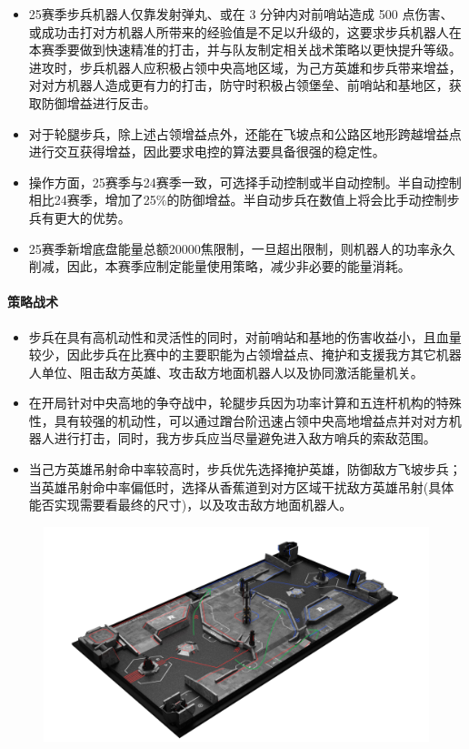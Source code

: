\begin{itemize}
            \item 25赛季步兵机器人仅靠发射弹丸、或在 3 分钟内对前哨站造成 500 点伤害、或成功击打对方机器人所带来的经验值是不足以升级的，这要求步兵机器人在本赛季要做到快速精准的打击，并与队友制定相关战术策略以更快提升等级。进攻时，步兵机器人应积极占领中央高地区域，为己方英雄和步兵带来增益，对对方机器人造成更有力的打击，防守时积极占领堡垒、前哨站和基地区，获取防御增益进行反击。
            \item 对于轮腿步兵，除上述占领增益点外，还能在飞坡点和公路区地形跨越增益点进行交互获得增益，因此要求电控的算法要具备很强的稳定性。
            \item 操作方面，25赛季与24赛季一致，可选择手动控制或半自动控制。半自动控制相比24赛季，增加了25\%的防御增益。半自动步兵在数值上将会比手动控制步兵有更大的优势。	
            \item 25赛季新增底盘能量总额20000焦限制，一旦超出限制，则机器人的功率永久削减，因此，本赛季应制定能量使用策略，减少非必要的能量消耗。
        \end{itemize}
    
    \paragraph{策略战术}


        \begin{itemize}
            \item 步兵在具有高机动性和灵活性的同时，对前哨站和基地的伤害收益小，且血量较少，因此步兵在比赛中的主要职能为占领增益点、掩护和支援我方其它机器人单位、阻击敌方英雄、攻击敌方地面机器人以及协同激活能量机关。
            \item 在开局针对中央高地的争夺战中，轮腿步兵因为功率计算和五连杆机构的特殊性，具有较强的机动性，可以通过蹭台阶迅速占领中央高地增益点并对对方机器人进行打击，同时，我方步兵应当尽量避免进入敌方哨兵的索敌范围。
            \item 当己方英雄吊射命中率较高时，步兵优先选择掩护英雄，防御敌方飞坡步兵；当英雄吊射命中率偏低时，选择从香蕉道到对方区域干扰敌方英雄吊射(具体能否实现需要看最终的尺寸)，以及攻击敌方地面机器人。
        \end{itemize}

        \begin{figure}[H]
            \centering
            \includegraphics[height=0.35\textwidth]{figure/infantry_tactics.png}
            \hspace{0.5em}
            \label{fig:infantry_tactics}
        \end{figure}
    
